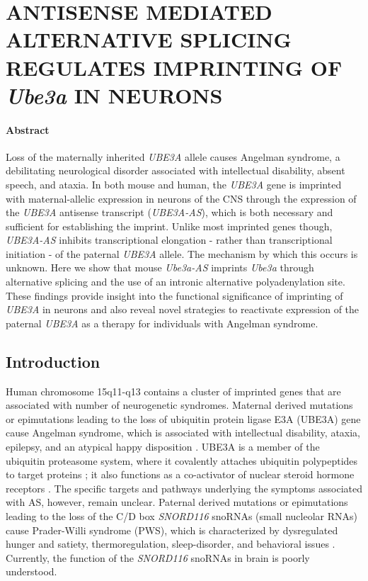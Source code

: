 
\chapter{\uppercase {Antisense mediated alternative splicing regulates imprinting of} \emph{Ube3a} \uppercase{in neurons}}

\subsubsection*{Abstract}

Loss of the maternally inherited \textit{UBE3A} allele causes Angelman syndrome, a debilitating neurological disorder associated with intellectual disability, absent speech, and ataxia.  In both mouse and human, the \textit{UBE3A} gene is imprinted with maternal-allelic expression in neurons of the CNS through the expression of the \textit{UBE3A} antisense transcript (\textit{UBE3A-AS}), which is both necessary and sufficient for establishing the imprint.  Unlike most imprinted genes though, \textit{UBE3A-AS} inhibits transcriptional elongation - rather than transcriptional initiation - of the paternal \textit{UBE3A} allele.  The mechanism by which this occurs is unknown.  Here we show that mouse \textit{Ube3a-AS} imprints \textit{Ube3a} through alternative splicing and the use of an intronic alternative polyadenylation site.  These findings provide insight into the functional significance of imprinting of \textit{UBE3A} in neurons and also reveal novel strategies to reactivate expression of the paternal \textit{UBE3A} as a therapy for individuals with Angelman syndrome. 

\section{Introduction}

Human chromosome 15q11-q13 contains a cluster of imprinted genes that are associated with number of neurogenetic syndromes. Maternal derived mutations or epimutations leading to the loss of ubiquitin protein ligase E3A (UBE3A) gene cause Angelman syndrome, which is associated with intellectual disability, ataxia, epilepsy, and an atypical happy disposition \cite{Matsuura1997,Kishino1997}. UBE3A is a member of the ubiquitin proteasome system, where it covalently attaches ubiquitin polypeptides to target proteins \cite{Scheffner1993}; it also functions as a co-activator of nuclear steroid hormone receptors \cite{Dhananjayan2006,Khan2006}. The specific targets and pathways underlying the symptoms associated with AS, however, remain unclear.  Paternal derived mutations or epimutations leading to the loss of the C/D box \textit{SNORD116} snoRNAs (small nucleolar RNAs) cause Prader-Willi syndrome (PWS), which is characterized by dysregulated hunger and satiety, thermoregulation, sleep-disorder, and behavioral issues \cite{Sahoo2008}.  Currently, the function of the \textit{SNORD116} snoRNAs in brain is poorly understood.

